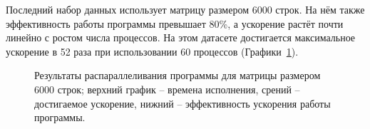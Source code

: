 \documentclass[12pt, oneside, a4paper]{article}
\begin{document}
Последний набор данных использует матрицу размером 6000 строк. На нём также эффективность работы программы превышает 80\%, а ускорение растёт почти линейно с ростом числа процессов. На этом датасете достигается максимальное ускорение в 52 раза при использовании 60 процессов (Графики~\ref{fig:m6000}).

\begin{figure}[h!]
\caption{Результаты распараллеливания программы для матрицы размером 6000 строк; верхний график -- времена исполнения, срений -- достигаемое ускорение, нижний -- эффективность ускорения работы программы.}
\label{fig:m6000}
\end{figure}
\end{document}
